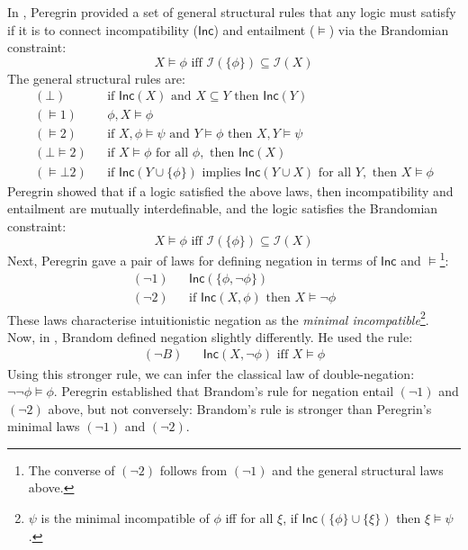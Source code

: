 In \cite{peregrin}, Peregrin provided a set of general structural rules that any logic must satisfy if it is to connect incompatibility ($\mathsf{Inc}$) and entailment ($\models$) via the Brandomian constraint:
\[
X \models \phi \text{ iff } \mathcal{I}(\{\phi\}) \subseteq \mathcal{I}(X)
\]
The general structural rules are:
\begin{eqnarray*}
(\bot) & & \text{if } \mathsf{Inc}(X) \text{ and } X \subseteq Y \text{ then } \mathsf{Inc}(Y) \\
(\models 1) & & \phi, X \models \phi \\
(\models 2) & & \text{if }X, \phi \models \psi \text{ and } Y \models \phi \text{ then } X, Y \models \psi \\
(\bot \models 2) & & \text{if } X \models \phi \text{ for all } \phi, \text{ then } \mathsf{Inc}(X) \\
(\models \bot 2) & & \text{if } \mathsf{Inc}(Y \cup \{\phi\}) \text{ implies } \mathsf{Inc}(Y \cup X) \text{ for all } Y, \text{ then } X \models \phi
\end{eqnarray*}
Peregrin showed that if a logic satisfied the above laws, then incompatibility and entailment are mutually interdefinable, and the logic satisfies the Brandomian constraint:
\[
X \models \phi \text{ iff } \mathcal{I}(\{\phi\}) \subseteq \mathcal{I}(X)
\]
Next, Peregrin gave a pair of laws for defining negation in terms of $\mathsf{Inc}$ and $\models$\footnote{The converse of $(\neg 2)$ follows from $(\neg 1)$ and the general structural laws above.}:
\begin{eqnarray*}
(\neg 1) & & \mathsf{Inc}(\{\phi, \neg \phi\}) \\
(\neg 2) & & \text{if } \mathsf{Inc}(X, \phi) \text{ then } X \models \neg \phi
\end{eqnarray*}
These laws characterise intuitionistic negation as the \emph{minimal incompatible}\footnote{$\psi$ is the minimal incompatible of $\phi$ iff for all $\xi$, if $\mathsf{Inc}(\{\phi\} \cup \{\xi\})$ then $\xi \models \psi$.}.
Now, in \cite{brandom}, Brandom defined negation slightly differently. He used the rule:
\begin{eqnarray*}
(\neg B) & &\mathsf{Inc}(X, \neg \phi) \text{ iff } X \models \phi
\end{eqnarray*}
Using this stronger rule, we can infer the classical law of double-negation: $\neg \neg \phi \models \phi$.
Peregrin established that Brandom's rule for negation entail $(\neg 1)$ and $(\neg 2)$ above, but not conversely: Brandom's rule is stronger than Peregrin's minimal laws $(\neg 1)$ and $(\neg 2)$.

